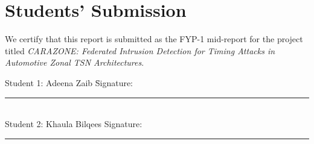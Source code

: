\chapter*{Students' Submission}
We certify that this report is submitted as the FYP-1 mid-report for the project
titled \emph{CARAZONE: Federated Intrusion Detection for Timing Attacks in
Automotive Zonal TSN Architectures}.

\begin{tabbing}
Student 1: Adeena Zaib \hspace{3cm} \= Signature: \rule{4cm}{0.4pt} \\[2em]
Student 2: Khaula Bilqees \> Signature: \rule{4cm}{0.4pt}
\end{tabbing}

